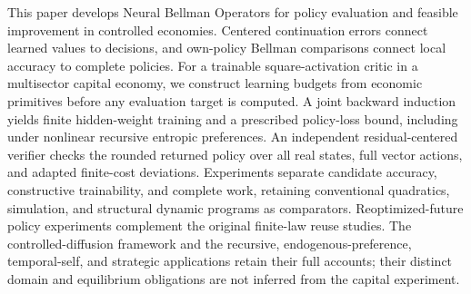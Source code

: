 This paper develops Neural Bellman Operators for policy evaluation and feasible
improvement in controlled economies. Centered continuation errors connect
learned values to decisions, and own-policy Bellman comparisons connect local
accuracy to complete policies. For a trainable square-activation critic in a
multisector capital economy, we construct learning budgets from economic
primitives before any evaluation target is computed. A joint backward
induction yields finite hidden-weight training and a prescribed policy-loss
bound, including under nonlinear recursive entropic preferences. An independent
residual-centered verifier checks the rounded returned policy over all real
states, full vector actions, and adapted finite-cost deviations. Experiments
separate candidate accuracy, constructive trainability, and complete work,
retaining conventional quadratics, simulation, and structural dynamic programs
as comparators. Reoptimized-future policy experiments complement the original
finite-law reuse studies. The controlled-diffusion framework and the recursive,
endogenous-preference, temporal-self, and strategic applications retain their
full accounts; their distinct domain and equilibrium obligations are not
inferred from the capital experiment.

